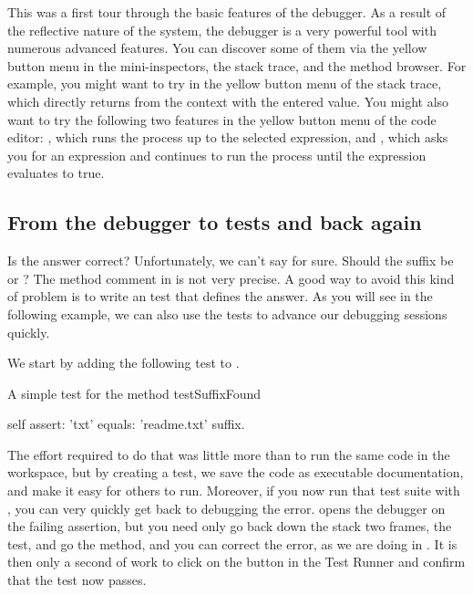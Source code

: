 \documentclass[a4paper,10pt,twoside]{book}
\begin{document}
This was a first tour through the basic features of the debugger.
As a result of the reflective nature of the \squeak system, the debugger is a very powerful tool with numerous advanced features.
You can discover some of them via the yellow button menu in the mini-inspectors, the stack trace, and the method browser.
For example, you might want to try  in the yellow button menu of the stack trace, which directly returns from the context with the entered value.
You might also want to try the following two features in the yellow button menu of the code editor: , which runs the process up to the selected expression, and , which asks you for an expression and continues to run the process until the expression evaluates to true.

\subsection{From the debugger to tests and back again}

Is the answer correct?
Unfortunately, we can't say for sure.
Should the suffix be  or ?
The method comment in  is not very precise.
A good way to avoid this kind of problem is to write an  test that defines the answer.
As you will see in the following example, we can also use the tests to advance our debugging sessions quickly.

We start by adding the following test  to .

\begin{method}[testSuffix]{A simple test for the  method}
testSuffixFound

	self assert: 'txt' equals: 'readme.txt' suffix.
\end{method}

The effort required to do that was little more than to run the same code in the workspace, but by creating a test, we save the code as executable documentation, and make it easy for others to run.
Moreover, if you now run that test suite with \sunit, you can very quickly get back to debugging the error.
\sunit opens the debugger on the failing assertion, but you need only go back down the stack two frames,  the test, and go  the  method, and you can correct the error, as we are doing in .
It is then only a second of work to click on the  button in the \sunit Test Runner and confirm that the test now passes.
\end{document}
